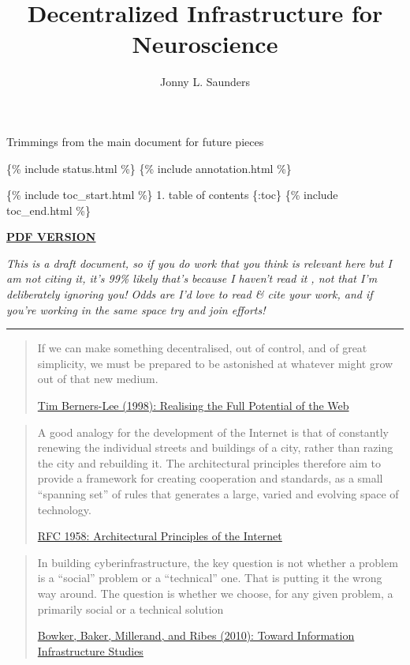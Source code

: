 \documentclass[10pt]{tufte-book}
\title{Decentralized Infrastructure for Neuroscience}
\author{Jonny L. Saunders}
\begin{document}
\frontmatter

\clearpage

\maketitle

\pagebreak

Trimmings {from the main document for future pieces}

\{\% include status.html \%\} \{\% include annotation.html \%\}

\{\% include toc\_start.html \%\} 1. table of contents \{:toc\} \{\%
include toc\_end.html \%\}

\href{https://jon-e.net/infrastructure/tex/decentralized_infrastructure_render.pdf}{\textbf{PDF
VERSION}}

\emph{This is a draft document, so if you do work that you think is
relevant here but I am not citing it, it's 99\% likely that's because I
haven't read it , not that I'm deliberately ignoring you! Odds are I'd
love to read \& cite your work, and if you're working in the same space
try and join efforts!}

\begin{center}\rule{0.5\linewidth}{0.5pt}\end{center}

\begin{quote}
If we can make something decentralised, out of control, and of great
simplicity, we must be prepared to be astonished at whatever might grow
out of that new medium.

\href{https://www.w3.org/1998/02/Potential.html}{Tim Berners-Lee (1998):
Realising the Full Potential of the Web}
\end{quote}

\begin{quote}
A good analogy for the development of the Internet is that of constantly
renewing the individual streets and buildings of a city, rather than
razing the city and rebuilding it. The architectural principles
therefore aim to provide a framework for creating cooperation and
standards, as a small ``spanning set'' of rules that generates a large,
varied and evolving space of technology.

\href{https://datatracker.ietf.org/doc/html/rfc1958}{RFC 1958:
Architectural Principles of the Internet}
\end{quote}

\begin{quote}
In building cyberinfrastructure, the key question is not whether a
problem is a ``social'' problem or a ``technical'' one. That is putting
it the wrong way around. The question is whether we choose, for any
given problem, a primarily social or a technical solution

\href{https://doi.org/10.1007/978-1-4020-9789-8_5}{Bowker, Baker, Millerand, and Ribes (2010): Toward Information Infrastructure Studies}

\end{quote}
\end{document}
